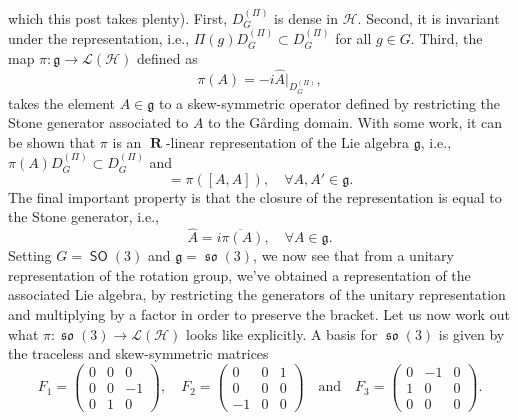 \documentclass[a4paper]{article}
\DeclareMathOperator{\R}{\mathbf{R}}
\DeclareMathOperator{\SO}{\mathsf{SO}}
\DeclareMathOperator{\so}{\mathfrak{so}}
\begin{document}
    which this post takes plenty).
    First, $D_G^{(\Pi)}$ is dense in $\mathcal{H}$.
    Second, it is invariant under the representation,
    i.e., $\Pi(g) D_G^{(\Pi)} \subset D_G^{(\Pi)}$ for
    all $g \in G$.  Third, the map $\pi : \mathfrak{g}
    \to \mathcal{L}(\mathcal{H})$ defined as
    \begin{equation}
        \pi(A)
        =
        -i \hat{A} \big|_{D_G^{(\Pi)}},
    \end{equation}
    takes the element $A \in \mathfrak{g}$ to a
    skew-symmetric operator defined by restricting the Stone
    generator associated to $A$ to the Gårding domain. With
    some work, it can be shown that $\pi$ is an $\R$-linear
    representation of the Lie algebra $\mathfrak{g}$, i.e.,
    $\pi(A)D_{G}^{(\Pi)} \subset D_{G}^{(\Pi)}$ and
    \begin{equation}
        [\pi(A), \pi(A')]
        =
        \pi([A,A]),
        \quad
        \forall A,A' \in \mathfrak{g}.
    \end{equation}
    The final important property is that the closure of the
    representation is equal to the Stone generator, i.e.,
    \begin{equation}
        \hat{A}
        =
        \overline{i\pi(A)},
        \quad
        \forall A \in \mathfrak{g}.
    \end{equation}
    Setting $G = \SO(3)$ and $\mathfrak{g}
    = \so(3)$, we now see that from a unitary
    representation of the rotation group, we've obtained a
    representation of the associated Lie algebra, by
    restricting the generators of the unitary representation
    and multiplying by a factor in order to preserve the
    bracket. Let us now work out what $\pi : \so(3) \to
    \mathcal{L}(\mathcal{H})$ looks like explicitly. A basis
    for $\so(3)$ is given by the traceless and
    skew-symmetric matrices
    \begin{equation}
        \label{eqn:so(3)-basis}
        F_1
        =
        \begin{pmatrix} 
            0 & 0 & 0 \\
            0 & 0 & -1 \\
            0 & 1 & 0 
        \end{pmatrix},
        \quad
        F_2
        =
        \begin{pmatrix} 
            0 & 0 & 1 \\
            0 & 0 & 0 \\
            -1 & 0 & 0
        \end{pmatrix}
        \quad\text{and}\quad
        F_3
        =
        \begin{pmatrix} 
            0 & -1 & 0 \\
            1 & 0 & 0 \\
            0 & 0 & 0
        \end{pmatrix}.
    \end{equation}
\end{document}
